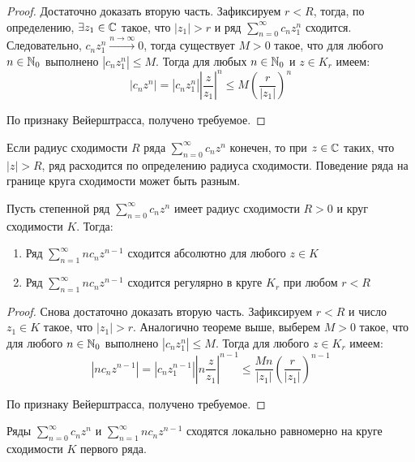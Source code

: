 \begin{proof}
	Достаточно доказать вторую часть. Зафиксируем $r < R$, тогда, по определению, $\exists z_1 \in \mathbb{C}$ такое, что $|z_1| > r$ и ряд $\sum_{n=0}^\infty c_nz_1^n$ сходится. Следовательно, $c_nz_1^n \xrightarrow{n \to \infty} 0$, тогда существует $M > 0$ такое, что для любого $n \in \mathbb{N}_0$ выполнено $|c_nz_1^n| \le M$. Тогда для любых $n \in \mathbb{N}_0$ и $z \in K_r$ имеем:
	\[|c_nz^n| = \left|c_nz_1^n\right|\left|\frac{z}{z_1}\right|^n \le M\left(\frac{r}{|z_1|}\right)^n\]
	
	По признаку Вейерштрасса, получено требуемое.
\end{proof}

\begin{note}
	Если радиус сходимости $R$ ряда $\sum_{n=0}^\infty c_nz^n$ конечен, то при $z \in \mathbb{C}$ таких, что $|z| > R$, ряд расходится по определению радиуса сходимости. Поведение ряда на границе круга сходимости может быть разным.
\end{note}

\begin{proposition}
	Пусть степенной ряд $\sum_{n=0}^\infty c_nz^n$ имеет радиус сходимости $R > 0$ и круг сходимости $K$. Тогда:
	\begin{enumerate}
		\item Ряд $\sum_{n = 1}^\infty nc_nz^{n-1}$ сходится абсолютно для любого $z \in K$
		\item Ряд $\sum_{n = 1}^\infty nc_nz^{n-1}$ сходится регулярно в круге $K_r$ при любом $r < R$
	\end{enumerate}
\end{proposition}

\begin{proof}
	Снова достаточно доказать вторую часть. Зафиксируем $r < R$ и число $z_1 \in K$ такое, что $|z_1| > r$. Аналогично теореме выше, выберем $M > 0$ такое, что для любого $n \in \mathbb{N}_0$ выполнено $|c_nz_1^n| \le M$. Тогда для любого $z \in K_r$ имеем:
	\[|nc_nz^{n-1}| = |c_nz_1^{n-1}|\left|n\frac{z}{z_1}\right|^{n-1} \le \frac{Mn}{|z_1|}\left(\frac{r}{|z_1|}\right)^{n-1}\]
	
	По признаку Вейерштрасса, получено требуемое.
\end{proof}

\begin{corollary}
	Ряды $\sum_{n=0}^\infty c_nz^n$ и $\sum_{n = 1}^\infty nc_nz^{n-1}$ сходятся локально равномерно на круге сходимости $K$ первого ряда.
\end{corollary}

